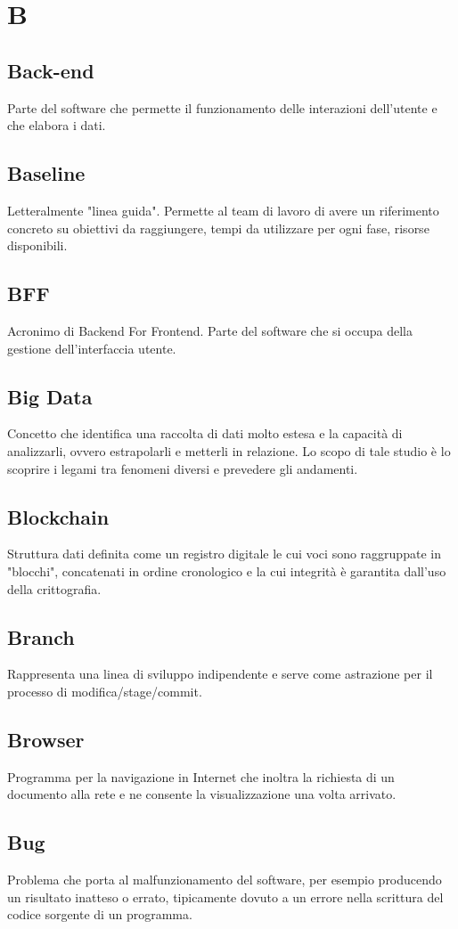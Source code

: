 \section*{B}
\markright{}

\subsection*{Back-end}
Parte del software che permette il funzionamento delle interazioni dell'utente e che elabora i dati.

\subsection*{Baseline}
Letteralmente "linea guida". Permette al team di lavoro di avere un riferimento concreto su obiettivi da raggiungere, tempi da utilizzare per ogni fase, risorse disponibili. 

\subsection*{BFF}
Acronimo di Backend For Frontend. Parte del software che si occupa della gestione dell'interfaccia utente.

\subsection*{Big Data}
Concetto che identifica una raccolta di dati molto estesa e la capacità di analizzarli, ovvero estrapolarli e metterli in relazione. Lo scopo di tale studio è lo scoprire i legami tra fenomeni diversi e prevedere gli andamenti.

\subsection*{Blockchain}
Struttura dati definita come un registro digitale le cui voci sono raggruppate in "blocchi", concatenati in ordine cronologico e la cui integrità è garantita dall'uso della crittografia.

\subsection*{Branch}
Rappresenta una linea di sviluppo indipendente e serve come astrazione per il processo di modifica/stage/commit.

\subsection*{Browser}
Programma per la navigazione in Internet che inoltra la richiesta di un documento alla rete e ne consente la visualizzazione una volta arrivato.

\subsection*{Bug}
Problema che porta al malfunzionamento del software, per esempio producendo un risultato inatteso o errato, tipicamente dovuto a un errore nella scrittura del codice sorgente di un programma. 




